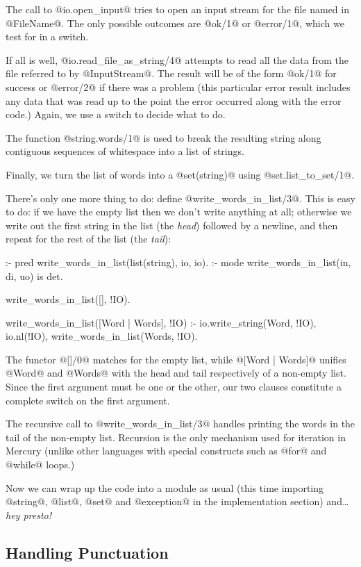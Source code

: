 The call to @io.open_input@ tries to open an input stream for the file
named in @FileName@.  
The only possible outcomes are @ok/1@ or @error/1@, which
we test for in a switch.

If all is well, @io.read_file_as_string/4@ attempts to read all the data
from the file referred to by @InputStream@.  The result will be of the form
@ok/1@ for success or @error/2@ if there was a problem (this particular
error result includes any data that was read up to the point the error
occurred along with the error code.)  Again, we use a switch to decide what
to do.

The function @string.words/1@ is used to break the resulting string along
contiguous sequences of whitespace into a list of strings.

Finally, we turn the list of words into a @set(string)@ using
@set.list_to_set/1@.

There's only one more thing to do: define @write_words_in_list/3@.
This is easy to do: if we have the empty list then we don't write
anything at all; otherwise we write out the first string in the list
(the \emph{head}) followed by a newline, and then repeat for the rest of
the list (the \emph{tail}):
\begin{myverbatim}
:- pred write_words_in_list(list(string), io, io).
:- mode write_words_in_list(in,           di, uo) is det.

write_words_in_list([],             !IO).

write_words_in_list([Word | Words], !IO) :-
    io.write_string(Word, !IO),
    io.nl(!IO),
    write_words_in_list(Words, !IO).
\end{myverbatim}
The functor @[]/0@ matches for the empty list, while @[Word | Words]@
unifies @Word@ and @Words@ with the head and tail respectively of a
non-empty list.  Since the first argument must be one or the other, our two
clauses constitute a complete switch on the first argument.

The recursive call to @write_words_in_list/3@ handles printing the words
in the tail of the non-empty list.  Recursion is the only mechanism used for
iteration in Mercury (unlike other languages with special constructs such as
@for@ and @while@ loops.)

Now we can wrap up the code into a module as usual (this time importing
@string@, @list@, @set@ and @exception@ in the implementation section)
and\ldots \emph{hey presto!}

\subsection{Handling Punctuation}

